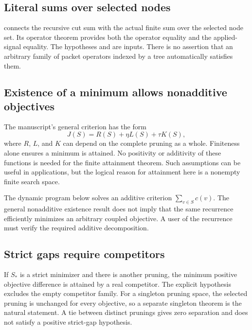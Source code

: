 \subsection{Literal sums over selected nodes}
 connects the recursive cut sum with the actual finite sum over the selected node set. Its operator theorem provides both the operator equality and the applied-signal equality.
The hypotheses  and  are inputs. There is no assertion that an arbitrary family of packet operators indexed by a tree automatically satisfies them.

\subsection{Existence of a minimum allows nonadditive objectives}
The manuscript's general criterion has the form
\[
J(S)=R(S)+\eta L(S)+\tau K(S),
\]
where $R$, $L$, and $K$ can depend on the complete pruning as a whole. Finiteness alone ensures a minimum is attained.
No positivity or additivity of these functions is needed for the finite attainment theorem. Such assumptions can be useful in applications, but the logical reason for attainment here is a nonempty finite search space.

The dynamic program below solves an additive criterion $\sum_{v\in S}c(v)$. The general nonadditive existence result does not imply that the same recurrence efficiently minimizes an arbitrary coupled objective. A user of the recurrence must verify the required additive decomposition.

\subsection{Strict gaps require competitors}
If $S_*$ is a strict minimizer and there is another pruning, the minimum positive objective difference is attained by a real competitor.
The explicit  hypothesis excludes the empty competitor family. For a singleton pruning space, the selected pruning is unchanged for every objective, so a separate singleton theorem is the natural statement. A tie between distinct prunings gives zero separation and does not satisfy a positive strict-gap hypothesis.


